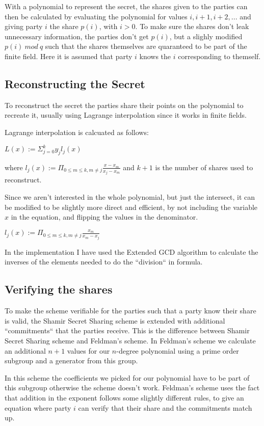 \documentclass[a4paper,oneside,12pt,final]{article}
\begin{document}
With a polynomial to represent the secret, the shares given to the parties can
then be calculated by evaluating the polynomial for values $i, i+1, i+2, ...$
and giving party $i$ the share $p(i)$, with $i > 0$. To make sure the shares
don't leak unnecessary information, the parties don't get $p(i)$, but a slighly
modified $p(i)\ mod\ q$ such that the shares themselves are quaranteed to be
part of the finite field. Here it is assumed that party $i$ knows the $i$
corresponding to themself.

\subsection{Reconstructing the Secret}

To reconstruct the secret the parties share their points on the polynomial to
recreate it, usually using Lagrange interpolation since it works in
finite fields.

Lagrange interpolation is calcuated as follows:

$L(x) := \Sigma_{j=0}^k y_j l_j(x)$

where 
$l_j(x) := \Pi_{0 \leq m \leq k, m \neq j}\frac{x - x_m}{x_j - x_m}$
and $k+1$ is the number of shares used to reconstruct. 

Since we aren't interested in the whole polynomial, but just the intersect, it
can be modified to be slightly more direct and efficient, by not including the
variable $x$ in the equation, and flipping the values in the denominator.

$l_j(x) := \Pi_{0 \leq m \leq k, m \neq j}\frac{x_m}{x_m - x_j}$

In the implementation I have used the Extended GCD algorithm to calculate 
the inverses of the elements needed to do the ``division`` in formula.

\subsection{Verifying the shares}

To make the scheme verifiable for the parties such that a party know their share
is valid, the Shamir Secret Sharing scheme is extended with additional
``commitments`` that the parties receive. This is the difference between Shamir
Secret Sharing scheme and Feldman's scheme. In Feldman's scheme we calculate an
additional $n+1$ values for our $n$-degree polynomial using a prime order
subgroup and a generator from this group. 

In this scheme the coefficients we picked for our polynomial have to be part of
this subgroup otherwise the scheme doesn't work. Feldman's scheme uses the fact
that addition in the exponent follows some slightly different rules, to give an
equation where party $i$ can verify that their share and the commitments match
up. 
\end{document}
